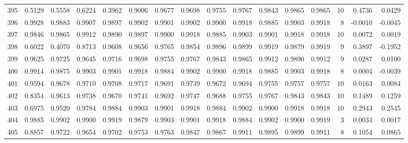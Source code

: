 \begin{tabular}{lrrrrrrrrrrrrrrr}
395 &      0.5129 &  0.5558 &  0.6224 &  0.3962 &  0.9006 &  0.9677 &  0.9698 &  0.9755 &  0.9767 &  0.9843 &   0.9865 &     0.9865 &     10 &                    0.4736 &                     0.0429 \\
396 &      0.9928 &  0.9883 &  0.9907 &  0.9897 &  0.9902 &  0.9901 &  0.9902 &  0.9900 &  0.9918 &  0.9885 &   0.9903 &     0.9918 &      8 &                   -0.0010 &                    -0.0045 \\
397 &      0.9846 &  0.9865 &  0.9912 &  0.9890 &  0.9897 &  0.9900 &  0.9918 &  0.9885 &  0.9903 &  0.9901 &   0.9918 &     0.9918 &     10 &                    0.0072 &                     0.0019 \\
398 &      0.6022 &  0.4070 &  0.8713 &  0.9608 &  0.9656 &  0.9765 &  0.9854 &  0.9896 &  0.9899 &  0.9919 &   0.9879 &     0.9919 &      9 &                    0.3897 &                    -0.1952 \\
399 &      0.9625 &  0.9725 &  0.9645 &  0.9716 &  0.9698 &  0.9755 &  0.9767 &  0.9843 &  0.9865 &  0.9912 &   0.9890 &     0.9912 &      9 &                    0.0287 &                     0.0100 \\
400 &      0.9914 &  0.9875 &  0.9903 &  0.9901 &  0.9918 &  0.9884 &  0.9902 &  0.9900 &  0.9918 &  0.9885 &   0.9903 &     0.9918 &      8 &                    0.0004 &                    -0.0039 \\
401 &      0.9594 &  0.9678 &  0.9710 &  0.9708 &  0.9717 &  0.9691 &  0.9739 &  0.9672 &  0.9694 &  0.9755 &   0.9757 &     0.9757 &     10 &                    0.0163 &                     0.0084 \\
402 &      0.8354 &  0.9613 &  0.9738 &  0.9670 &  0.9741 &  0.9692 &  0.9747 &  0.9688 &  0.9755 &  0.9767 &   0.9843 &     0.9843 &     10 &                    0.1489 &                     0.1259 \\
403 &      0.6975 &  0.9520 &  0.9784 &  0.9884 &  0.9903 &  0.9901 &  0.9918 &  0.9884 &  0.9902 &  0.9900 &   0.9918 &     0.9918 &     10 &                    0.2943 &                     0.2545 \\
404 &      0.9885 &  0.9902 &  0.9900 &  0.9919 &  0.9879 &  0.9903 &  0.9901 &  0.9918 &  0.9884 &  0.9902 &   0.9900 &     0.9919 &      3 &                    0.0034 &                     0.0017 \\
405 &      0.8857 &  0.9722 &  0.9654 &  0.9702 &  0.9753 &  0.9763 &  0.9847 &  0.9867 &  0.9911 &  0.9895 &   0.9899 &     0.9911 &      8 &                    0.1054 &                     0.0865 \\

\end{tabular}
